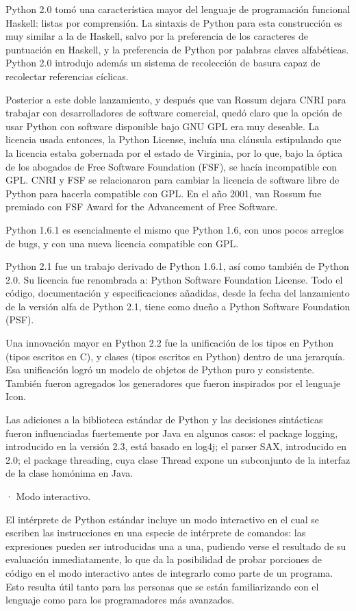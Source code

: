 Python 2.0 tomó una característica mayor del lenguaje de programación funcional Haskell: listas por comprensión. La sintaxis de Python para esta construcción es muy similar a la de Haskell, salvo por la preferencia de los caracteres de puntuación en Haskell, y la preferencia de Python por palabras claves alfabéticas. Python 2.0 introdujo además un sistema de recolección de basura capaz de recolectar referencias cíclicas.

Posterior a este doble lanzamiento, y después que van Rossum dejara CNRI para trabajar con desarrolladores de software comercial, quedó claro que la opción de usar Python con software disponible bajo GNU GPL era muy deseable. La licencia usada entonces, la Python License, incluía una cláusula estipulando que la licencia estaba gobernada por el estado de Virginia, por lo que, bajo la óptica de los abogados de Free Software Foundation (FSF), se hacía incompatible con GPL. CNRI y FSF se relacionaron para cambiar la licencia de software libre de Python para hacerla compatible con GPL. En el año 2001, van Rossum fue premiado con FSF Award for the Advancement of Free Software.

Python 1.6.1 es esencialmente el mismo que Python 1.6, con unos pocos arreglos de bugs, y con una nueva licencia compatible con GPL.

Python 2.1 fue un trabajo derivado de Python 1.6.1, así como también de Python 2.0. Su licencia fue renombrada a: Python Software Foundation License. Todo el código, documentación y especificaciones añadidas, desde la fecha del lanzamiento de la versión alfa de Python 2.1, tiene como dueño a Python Software Foundation (PSF).

Una innovación mayor en Python 2.2 fue la unificación de los tipos en Python (tipos escritos en C), y clases (tipos escritos en Python) dentro de una jerarquía. Esa unificación logró un modelo de objetos de Python puro y consistente. También fueron agregados los generadores que fueron inspirados por el lenguaje Icon.

Las adiciones a la biblioteca estándar de Python y las decisiones sintácticas fueron influenciadas fuertemente por Java en algunos casos: el package logging, introducido en la versión 2.3, está basado en log4j; el parser SAX, introducido en 2.0; el package threading, cuya clase Thread expone un subconjunto de la interfaz de la clase homónima en Java.

· Modo interactivo.

El intérprete de Python estándar incluye un modo interactivo en el cual se escriben las instrucciones en una especie de intérprete de comandos: las expresiones pueden ser introducidas una a una, pudiendo verse el resultado de su evaluación inmediatamente, lo que da la posibilidad de probar porciones de código en el modo interactivo antes de integrarlo como parte de un programa. Esto resulta útil tanto para las personas que se están familiarizando con el lenguaje como para los programadores más avanzados.

